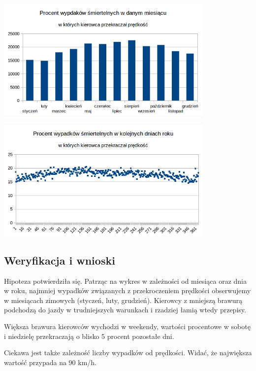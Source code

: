 \includegraphics[width=0.8\textwidth]{images/hipotheses/speed/speed_exceeded_by_month.png}

\includegraphics[width=0.8\textwidth]{images/hipotheses/speed/speed_exceeded_by_day_of_year.png}

\subsection{Weryfikacja i wnioski}\label{weryfikacja-i-wnioski}

Hipoteza potwierdziła się. Patrząc na wykres w zależności od miesiąca
oraz dnia w roku, najmniej wypadków związanych z przekroczeniem
prędkości obserwujemy w miesiącach zimowych (styczeń, luty, grudzień).
Kierowcy z mniejszą brawurą podchodzą do jazdy w trudniejszych warunkach
i rzadziej łamią wtedy przepisy.

Większa brawura kierowców wychodzi w weekendy, wartości procentowe w
sobotę i niedzielę przekraczają o blisko 5 procent pozostałe dni.

Ciekawa jest także zależność liczby wypadków od prędkości. Widać, że
największa wartość przypada na 90 km/h.
